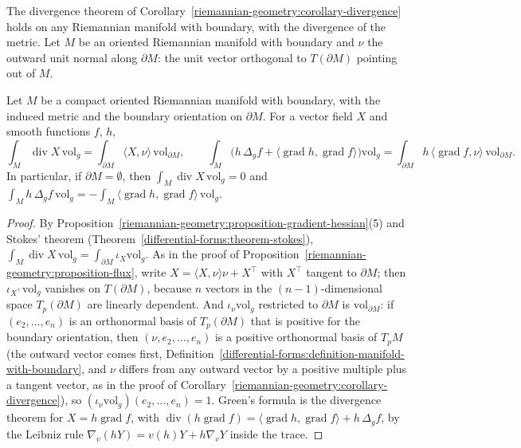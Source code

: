 The divergence theorem of Corollary~\ref{riemannian-geometry:corollary-divergence} holds on any Riemannian manifold with boundary, with the divergence of the metric. Let $M$ be an oriented Riemannian manifold
with boundary and $\nu$ the outward unit normal along $\partial M$: the unit vector orthogonal to $T(\partial M)$ pointing out of $M$.

\begin{proposition}\label{riemannian-geometry:proposition-riemannian-divergence}
Let $M$ be a compact oriented Riemannian manifold with boundary, with the induced metric and the boundary orientation on $\partial M$. For a vector field $X$ and smooth functions $f$, $h$,
\[
\int_M\operatorname{div}X\,\mathrm{vol}_g = \int_{\partial M}\langle X, \nu\rangle\,\mathrm{vol}_{\partial M}, \qquad
\int_M\bigl(h\,\Delta_gf + \langle\operatorname{grad}h, \operatorname{grad}f\rangle\bigr)\mathrm{vol}_g = \int_{\partial M}h\,\langle\operatorname{grad}f, \nu\rangle\,\mathrm{vol}_{\partial M} .
\]
In particular, if $\partial M = \emptyset$, then $\int_M\operatorname{div}X\,\mathrm{vol}_g = 0$ and $\int_Mh\,\Delta_gf\,\mathrm{vol}_g = -\int_M\langle\operatorname{grad}h, \operatorname{grad}f\rangle\,\mathrm{vol}_g$.
\end{proposition}

\begin{proof}
By Proposition~\ref{riemannian-geometry:proposition-gradient-hessian}(5) and Stokes' theorem (Theorem~\ref{differential-forms:theorem-stokes}), $\int_M\operatorname{div}X\,\mathrm{vol}_g = \int_{\partial M}\iota_X\mathrm{vol}_g$. As
in the proof of Proposition~\ref{riemannian-geometry:proposition-flux}, write $X = \langle X, \nu\rangle\nu + X^\top$ with $X^\top$ tangent to $\partial M$; then $\iota_{X^\top}\mathrm{vol}_g$ vanishes on $T(\partial M)$, because
$n$ vectors in the $(n-1)$-dimensional space $T_p(\partial M)$ are linearly dependent. And $\iota_\nu\mathrm{vol}_g$ restricted to $\partial M$ is $\mathrm{vol}_{\partial M}$: if $(e_2, \ldots, e_n)$ is an orthonormal basis of
$T_p(\partial M)$ that is positive for the boundary orientation, then $(\nu, e_2, \ldots, e_n)$ is a positive orthonormal basis of $T_pM$ (the outward vector comes first,
Definition~\ref{differential-forms:definition-manifold-with-boundary}, and $\nu$ differs from any outward vector by a positive multiple plus a tangent vector, as in the proof of
Corollary~\ref{riemannian-geometry:corollary-divergence}), so $(\iota_\nu\mathrm{vol}_g)(e_2, \ldots, e_n) = 1$. Green's formula is the divergence theorem for $X = h\operatorname{grad}f$, with
$\operatorname{div}(h\operatorname{grad}f) = \langle\operatorname{grad}h, \operatorname{grad}f\rangle + h\,\Delta_gf$, by the Leibniz rule $\nabla_v(hY) = v(h)Y + h\nabla_vY$ inside the trace.
\end{proof}

